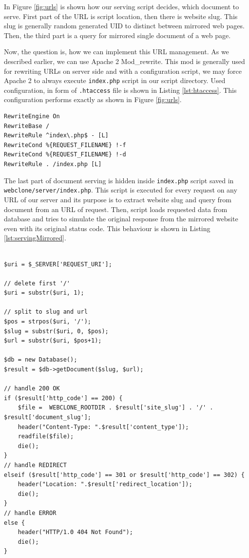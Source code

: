 In Figure \ref{fig:urls} is shown how our serving script decides, which document to serve. First part of the URL is script location, then there is website slug. This slug is generally random generated UID to distinct between mirrored web pages. Then, the third part is a query for mirrored single document of a web page.

Now, the question is, how we can implement this URL management. As we described earlier, we can use Apache 2 Mod\_rewrite. This mod is generally used for rewriting URLs on server side and with a configuration script, we may force Apache 2 to always execute \texttt{index.php} script in our script directory. Used configuration, in form of \texttt{.htaccess} file is shown in Listing \ref{lst:htaccess}. This configuration performs exactly as shown in Figure \ref{fig:urls}.

\begin{lstlisting}[caption={Example of .htaccess for Apache 2 mod\_rewrite},label={lst:htaccess}]
RewriteEngine On
RewriteBase /
RewriteRule ^index\.php$ - [L]
RewriteCond %{REQUEST_FILENAME} !-f
RewriteCond %{REQUEST_FILENAME} !-d
RewriteRule . /index.php [L]
\end{lstlisting}

The last part of document serving is hidden inside \texttt{index.php} script saved in \texttt{webclone/server/index.php}. This script is executed for every request on any URL of our server and its purpose is to extract website slug and query from document from an URL of request. Then, script loads requested data from database and tries to simulate the original response from the mirrored website even with its original status code.  This behaviour is shown in Listing \ref{lst:servingMirrored}.

\begin{lstlisting}[caption={Serving of mirrored documents},label={lst:servingMirrored}]

$uri = $_SERVER['REQUEST_URI'];

// delete first '/'
$uri = substr($uri, 1);

// split to slug and url
$pos = strpos($uri, '/');
$slug = substr($uri, 0, $pos);
$url = substr($uri, $pos+1);

$db = new Database();
$result = $db->getDocument($slug, $url);

// handle 200 OK
if ($result['http_code'] == 200) {
    $file =  WEBCLONE_ROOTDIR . $result['site_slug'] . '/' . $result['document_slug'];
    header("Content-Type: ".$result['content_type']);
    readfile($file);
    die();
} 
// handle REDIRECT
elseif ($result['http_code'] == 301 or $result['http_code'] == 302) {
    header("Location: ".$result['redirect_location']);
    die();
}
// handle ERROR
else {
    header("HTTP/1.0 404 Not Found");
    die();
}
\end{lstlisting}

